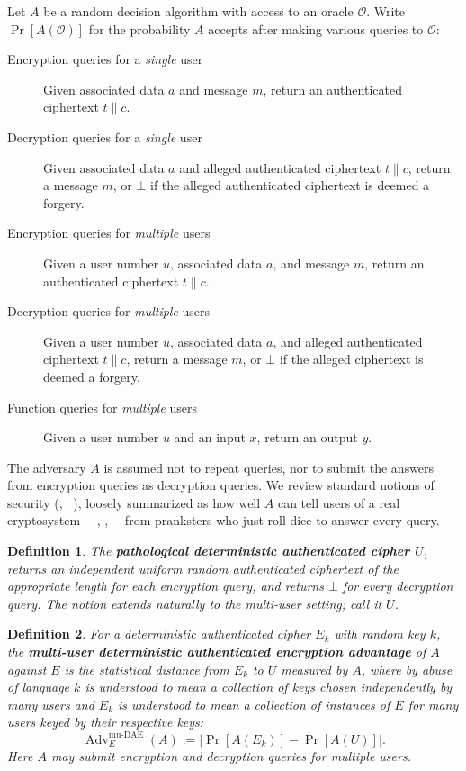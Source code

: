 \documentclass[draft]{article}
\newtheorem{definition}{Definition}
\newcommand{\term}[1]{\textbf{#1}}
\DeclareRobustCommand{\operatorsc}[1]{{%
  \ifmmode\let\next=\operatorname\else\let\next=\relax\fi\next{\textsc{#1}}}}
\def\XSalsa#1/{\operatorsc{XSalsa#1}}
\def\Daence/{\operatorsc{Daence}}
\DeclareMathOperator{\Adv}{Adv}
\DeclareMathOperator{\muDAE}{mu-DAE}
\newcommand{\concat}{\mathbin\|}
\begin{document}
Let $A$ be a random decision algorithm with access to an oracle
 $\mathcal O$.
Write $\Pr[A(\mathcal O)]$ for the probability $A$ accepts after
 making various queries to $\mathcal O$:
%
\begin{description}
  \item[Encryption queries for a \emph{single} user]
    Given associated data $a$ and message $m$, return an authenticated
     ciphertext $t \concat c$.
  \item[Decryption queries for a \emph{single} user]
    Given associated data $a$ and alleged authenticated ciphertext
     $t \concat c$, return a message $m$, or $\bot$ if the alleged
     authenticated ciphertext is deemed a forgery.
  \item[Encryption queries for \emph{multiple} users]
    Given a user number $u$, associated data $a$, and message $m$,
     return an authenticated ciphertext $t \concat c$.
  \item[Decryption queries for \emph{multiple} users]
    Given a user number $u$, associated data $a$, and alleged
     authenticated ciphertext $t \concat c$, return a message $m$, or
     $\bot$ if the alleged ciphertext is deemed a forgery.
  \item[Function queries for \emph{multiple} users]
    Given a user number $u$ and an input $x$, return an output $y$.
\end{description}
%
The adversary $A$ is assumed not to repeat queries, nor to submit the
 answers from encryption queries as decryption queries.
We review standard notions of security
 (\eg,~%
  \cite[Definition~1]{rogaway-shrimpton2006keywrap}%
  \cite[\S3]{bellare-tackmann2016mu-ae-crypto}),
 loosely summarized as how well $A$ can tell users of a real
 cryptosystem---\Daence/, \XSalsa20/, \etc---from pranksters who just
 roll dice to answer every query.

\begin{definition}
  The \term{pathological deterministic authenticated cipher $U_1$}
   returns an independent uniform random authenticated ciphertext of
   the appropriate length for each encryption query, and returns
   $\bot$ for every decryption query.
  The notion extends naturally to the multi-user setting; call it
   $U$.
\end{definition}

\begin{definition}
  For a deterministic authenticated cipher $E_k$ with random key $k$,
   the
   \term{multi-user deterministic authenticated encryption advantage}
   of $A$ against $E$ is the statistical distance from $E_k$ to $U$
   measured by $A$, where by abuse of language $k$ is understood to
   mean a collection of keys chosen independently by many users and
   $E_k$ is understood to mean a collection of instances of $E$ for
   many users keyed by their respective keys:
  \[
    \Adv^{\muDAE}_E(A) := \lvert\Pr[A(E_k)] - \Pr[A(U)]\rvert.
  \]
  Here $A$ may submit encryption and decryption queries for
   \emph{multiple} users.
\end{definition}
\end{document}

